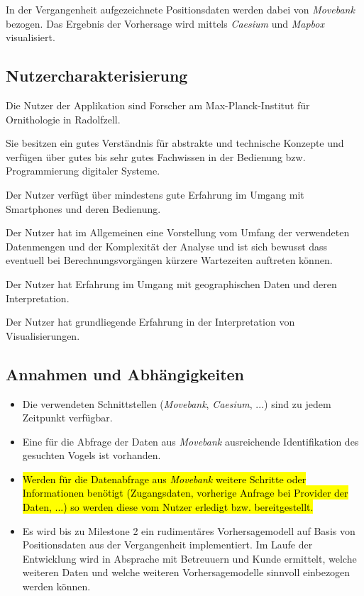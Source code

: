 \documentclass[12pt]{article} %
\begin{document}
In der Vergangenheit aufgezeichnete Positionsdaten werden dabei von \textit{Movebank} bezogen. Das Ergebnis der Vorhersage wird mittels \textit{Caesium} und \textit{Mapbox} visualisiert.


\subsection{Nutzercharakterisierung}

Die Nutzer der Applikation sind Forscher am Max-Planck-Institut für Ornithologie in Radolfzell.

Sie besitzen ein gutes Verständnis für abstrakte und technische Konzepte und verfügen über gutes bis sehr gutes Fachwissen in der Bedienung bzw. Programmierung digitaler Systeme.

Der Nutzer verfügt über mindestens gute Erfahrung im Umgang mit Smartphones und deren Bedienung.

Der Nutzer hat im Allgemeinen eine Vorstellung vom Umfang der verwendeten Datenmengen und der Komplexität der Analyse und ist sich bewusst dass eventuell bei Berechnungsvorgängen kürzere Wartezeiten auftreten können.

Der Nutzer hat Erfahrung im Umgang mit geographischen Daten und deren Interpretation.

Der Nutzer hat grundliegende Erfahrung in der Interpretation von Visualisierungen.


\subsection{Annahmen und Abhängigkeiten}


\begin{itemize} 
 	 \item Die verwendeten Schnittstellen (\textit{Movebank}, \textit{Caesium}, ...) sind zu jedem Zeitpunkt verfügbar.
 	 \item Eine für die Abfrage der Daten aus \textit{Movebank} ausreichende Identifikation des gesuchten Vogels ist vorhanden. 
 	 \item \hl{Werden für die Datenabfrage aus \textit{Movebank} weitere Schritte oder Informationen benötigt (Zugangsdaten, vorherige Anfrage bei Provider der Daten, ...) so werden diese vom Nutzer erledigt bzw. bereitgestellt.}
 	 \item Es wird bis zu Milestone 2 ein rudimentäres Vorhersagemodell auf Basis von Positionsdaten aus der Vergangenheit implementiert. Im Laufe der Entwicklung wird in Absprache mit Betreuuern und Kunde ermittelt, welche weiteren Daten und welche weiteren Vorhersagemodelle sinnvoll einbezogen werden können.
\end{itemize} 
\end{document}

